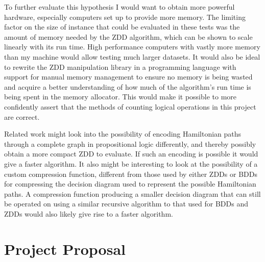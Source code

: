 \documentclass[12pt,a4paper,twoside,openright]{report}
\begin{document}
To further evaluate this hypothesis I would want to obtain more powerful hardware, especially computers set up to provide more memory. The limiting factor on the size of instance that could be evaluated in these tests was the amount of memory needed by the ZDD algorithm, which can be shown to scale linearly with its run time. High performance computers with vastly more memory than my machine would allow testing much larger datasets. It would also be ideal to rewrite the ZDD manipulation library in a programming language with support for manual memory management to ensure no memory is being wasted and acquire a better understanding of how much of the algorithm's run time is being spent in the memory allocator. This would make it possible to more confidently assert that the methods of counting logical operations in this project are correct.

Related work might look into the possibility of encoding Hamiltonian paths through a complete graph in propositional logic differently, and thereby possibly obtain a more compact ZDD to evaluate. If such an encoding is possible it would give a faster algorithm. It also might be interesting to look at the possibility of a custom compression function, different from those used by either ZDDs or BDDs for compressing the decision diagram used to represent the possible Hamiltonian paths. A compression function producing a smaller decision diagram that can still be operated on using a similar recursive algorithm to that used for BDDs and ZDDs would also likely give rise to a faster algorithm. 



\appendix

\chapter{Project Proposal}


\end{document}

